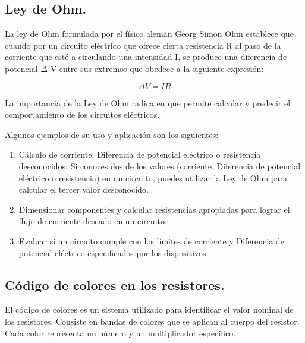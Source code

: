 \documentclass[10pt]{article}
\begin{document}
\begin{multicols}{2}
\subsection{Ley de Ohm.}

La ley de Ohm formulada por el físico alemán Georg Simon Ohm establece que cuando por un circuito eléctrico que ofrece cierta
resistencia R al paso de la corriente que esté a circulando una intensidad I, se produce
una diferencia de potencial $\Delta$ V entre sus extremos que obedece a la siguiente expresión:

\begin{equation}
	\Delta V = IR
\end{equation}

La importancia de la Ley de Ohm radica en que permite calcular y predecir el comportamiento de los circuitos eléctricos.

Algunos ejemplos de su uso y aplicación son los siguientes:

\begin{enumerate}
	\item Cálculo de corriente, Diferencia de potencial eléctrico o resistencia desconocidos: Si conoces dos de los valores (corriente, Diferencia de potencial eléctrico o resistencia) en un circuito, puedes utilizar la Ley de Ohm para calcular el tercer valor desconocido.
	\item Dimensionar componentes y calcular resistencias apropiadas para lograr el flujo de corriente deseado en un circuito.
	\item Evaluar si un circuito cumple con los límites de corriente y Diferencia de potencial eléctrico especificados por los dispositivos.
\end{enumerate}

\subsection{Código de colores en los resistores.}

El código de colores es un sistema utilizado para identificar el valor nominal de los resistores. Consiste en bandas de colores que se aplican al cuerpo del resistor. Cada color representa un número y un multiplicador específico. 


\end{multicols}
\end{document}
